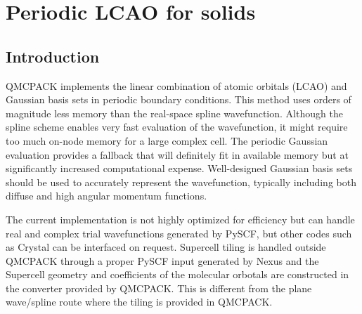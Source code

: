 \chapter{Periodic LCAO for solids}
\label{chap:LCAO}

\section{Introduction}

QMCPACK implements the linear combination of atomic orbitals (LCAO) and Gaussian
basis sets in periodic boundary conditions. This method uses orders of
magnitude less memory than the real-space spline wavefunction. Although
the spline scheme enables very fast evaluation of the wavefunction, it might
require too much on-node memory for a large complex cell. The periodic
Gaussian evaluation provides a fallback that will definitely fit in
available memory but at significantly increased computational
expense. Well-designed Gaussian basis sets should be used to accurately
represent the wavefunction, typically
including both diffuse and high angular momentum functions.

The current implementation is not highly optimized for efficiency but can handle real and complex trial wavefunctions generated by PySCF\cite{Sun2018}, but other codes such as
Crystal can be interfaced on request. Supercell tiling is handled outside QMCPACK through a proper PySCF input generated by Nexus and the Supercell geometry and coefficients of the molecular orbotals are constructed in the converter provided by QMCPACK. This is different from the plane wave/spline route where the tiling is provided in QMCPACK.   

